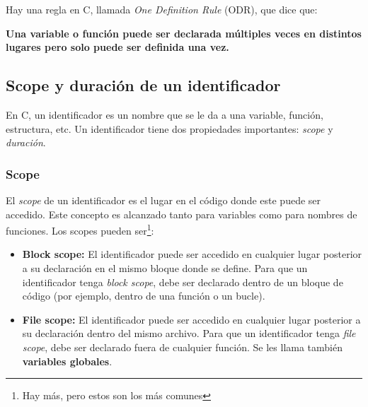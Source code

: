 \documentclass[]{scrartcl}
\begin{document}
Hay una regla en C, llamada \textit{One Definition Rule} (ODR), que dice que:

\begin{importantbox}
  \centering
  \textbf{Una variable o función puede ser declarada múltiples veces en distintos lugares pero solo puede ser definida una vez.}
\end{importantbox}

\subsection*{Scope y duración de un identificador}

En C, un identificador es un nombre que se le da a una variable, función, estructura, etc. Un identificador tiene dos propiedades importantes: \textit{scope} y \textit{duración}.

\subsubsection*{Scope}
El \textit{scope} de un identificador es el lugar en el código donde este puede ser accedido. Este concepto es alcanzado tanto para variables como para nombres de funciones.
Los scopes pueden ser\footnote{Hay más, pero estos son los más comunes}:
\begin{itemize}
    \item \textbf{Block scope:} El identificador puede ser accedido en cualquier lugar posterior a su declaración en el mismo bloque donde se define. Para que un identificador tenga \textit{block scope}, debe ser declarado dentro de un bloque de código (por ejemplo, dentro de una función o un bucle).
    \item \textbf{File scope:} El identificador puede ser accedido en cualquier lugar posterior a su declaración dentro del mismo archivo. Para que un identificador tenga \textit{file scope}, debe ser declarado fuera de cualquier función. Se les llama también \textbf{variables globales}.
\end{itemize}
\end{document}
